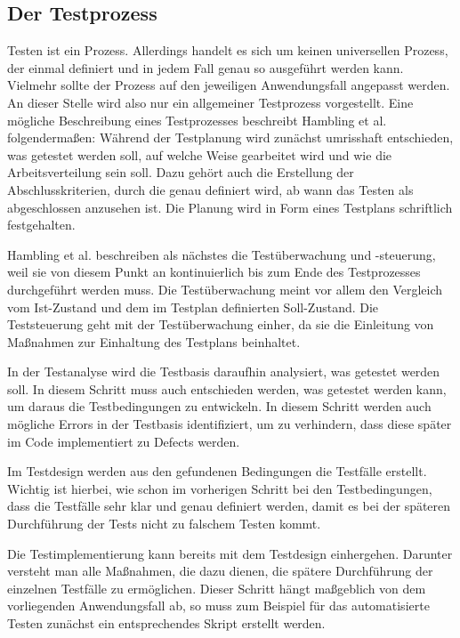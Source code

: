 \subsection{Der Testprozess}
Testen ist ein Prozess. Allerdings handelt es sich um keinen universellen Prozess, der einmal definiert und in jedem Fall genau so ausgeführt werden kann. Vielmehr sollte der Prozess auf den jeweiligen Anwendungsfall angepasst werden. An dieser Stelle wird also nur ein allgemeiner Testprozess vorgestellt. Eine mögliche Beschreibung eines Testprozesses beschreibt Hambling et al. folgendermaßen:
\newline
Während der Testplanung wird zunächst umrisshaft entschieden, was getestet werden soll, auf welche Weise gearbeitet wird und wie die Arbeitsverteilung sein soll. Dazu gehört auch die Erstellung der Abschlusskriterien, durch die genau definiert wird, ab wann das Testen als abgeschlossen anzusehen ist.  Die Planung wird in Form eines Testplans schriftlich festgehalten. 
\newline


Hambling et al. beschreiben als  nächstes die Testüberwachung und -steuerung, weil sie von diesem Punkt an kontinuierlich bis zum Ende des Testprozesses durchgeführt werden muss. Die Testüberwachung meint vor allem den Vergleich vom Ist-Zustand und dem im Testplan definierten Soll-Zustand. Die Teststeuerung geht mit der Testüberwachung einher, da sie die Einleitung von Maßnahmen zur Einhaltung des Testplans beinhaltet.
\newline


In der Testanalyse wird die Testbasis daraufhin analysiert, was getestet werden soll.  In diesem Schritt muss auch entschieden werden, was getestet werden kann, um daraus  die Testbedingungen zu entwickeln. In diesem Schritt werden auch mögliche Errors in der Testbasis identifiziert, um zu verhindern, dass diese später im Code implementiert zu Defects werden. 
\newline


Im Testdesign werden aus den gefundenen Bedingungen die Testfälle erstellt. Wichtig ist hierbei, wie schon im vorherigen Schritt bei den Testbedingungen, dass die Testfälle sehr klar und genau definiert werden, damit es bei der späteren Durchführung der Tests nicht zu falschem Testen kommt.
\newline


Die Testimplementierung kann bereits mit dem Testdesign einhergehen. Darunter versteht man alle Maßnahmen, die dazu dienen, die spätere Durchführung der einzelnen Testfälle zu ermöglichen. Dieser Schritt hängt maßgeblich von dem vorliegenden Anwendungsfall ab, so muss zum Beispiel für das automatisierte Testen zunächst ein entsprechendes Skript erstellt werden.
\newline


